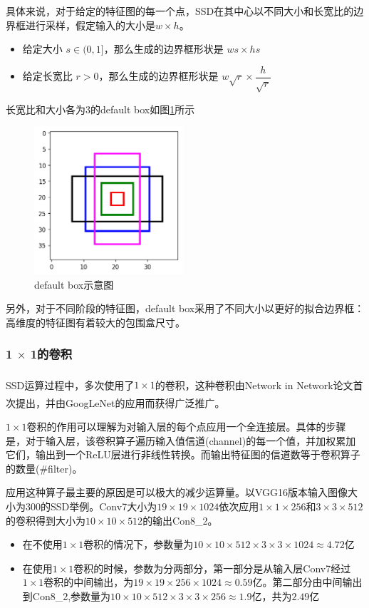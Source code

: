 \documentclass[12pt,a4paper,titlepage]{article}
\newcommand{\upcite}[1]{\textsuperscript{\textsuperscript{\cite{#1}}}}  %
\begin{document}
具体来说，对于给定的特征图的每一个点，SSD在其中心以不同大小和长宽比的边界框进行采样，假定输入的大小是$w \times h$。
\begin{itemize}
\item 给定大小 $s\in (0,1]$，那么生成的边界框形状是 $ws \times hs$
\item 给定长宽比 $r > 0$，那么生成的边界框形状是 $w\sqrt{r} \times \dfrac{h}{\sqrt{r}}$
\end {itemize}

长宽比和大小各为3的default box如图\ref{fig:defaultBox}所示

\begin{figure}[h]
\centering
\includegraphics[height=5.5cm]{img/defaultBox.png}
\caption{default box示意图}
\label{fig:defaultBox}
\end{figure}

另外，对于不同阶段的特征图，default box采用了不同大小以更好的拟合边界框：高维度的特征图有着较大的包围盒尺寸。

\subsubsection{1 $\times$ 1的卷积}
SSD运算过程中，多次使用了$1 \times 1$的卷积，这种卷积由Network in Network\upcite{lin2013network}论文首次提出，并由GoogLeNet\upcite{szegedy2015going}的应用而获得广泛推广。

$1\times 1$卷积的作用可以理解为对输入层的每个点应用一个全连接层。具体的步骤是，对于输入层，该卷积算子遍历输入值信道(channel)的每一个值，并加权累加它们，输出到一个ReLU层进行非线性转换。而输出特征图的信道数等于卷积算子的数量(\#filter)。\par

应用这种算子最主要的原因是可以极大的减少运算量。以VGG16版本输入图像大小为300的SSD举例。Conv7大小为$19 \times 19 \times 1024$依次应用$1 \times 1 \times 256$和$3 \times 3 \times 512$的卷积得到大小为$10 \times 10 \times 512$的输出Con8\_2。
\begin{itemize}
\item 在不使用$1 \times 1$卷积的情况下，参数量为$10 \times 10\times 512\times 3 \times 3 \times 1024 \approx4.72$亿
\item 在使用$1 \times 1$卷积的时候，参数为分两部分，第一部分是从输入层Conv7经过$1\times 1$卷积的中间输出，为$19\times 19\times 256\times 1024\approx 0.59$亿。第二部分由中间输出到Con8\_2,参数量为$10\times 10\times 512\times 3\times 3\times 256 \approx1.9$亿，共为$2.49$亿
\end{itemize}
\end{document}
